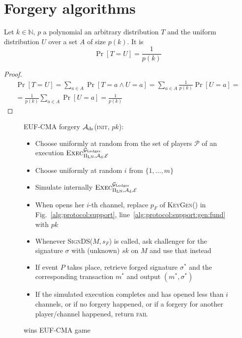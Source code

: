 \section{Forgery algorithms}
  \begin{proposition}
  \label{prop:distrib}
    Let $k \in \mathbb{N}$, $p$ a polynomial an arbitrary distribution $T$ and
    the uniform distribution $U$ over a set $A$ of size $p(k)$. It is
    \begin{equation*}
      \Pr[T = U] = \frac{1}{p(k)}
    \end{equation*}
  \end{proposition}

  \begin{proof}
    \begin{gather*}
      \Pr[T = U] = \sum\limits_{a \in A}\Pr[T = a \wedge U = a] = \sum\limits_{a
      \in A}\frac{1}{p(k)}\Pr[U = a] =\\
      = \frac{1}{p(k)}\sum\limits_{a \in A}\Pr[U = a] = \frac{1}{p(k)}
    \end{gather*}
  \end{proof}

  \begin{figure}[H]
    \begin{algobox}{\textsf{EUF-CMA} forgery}
      $\mathcal{A}_{\mathrm{ds}}$(\textsc{init}, $pk$):
      \begin{itemize}
        \item Choose uniformly at random \alice{} from the set of players
        $\mathcal{P}$ of an execution
        $\textsc{Exec}^{\mathcal{G}_{\mathrm{Ledger}}}_{\Pi_{\mathrm{LN}}, \mathcal{A}_{\mathrm{d}},
        \mathcal{E}}$
        \item Choose uniformly at random $i$ from $\{1, \dots, m\}$
        \item Simulate internally
        $\textsc{Exec}^{\mathcal{G}_{\mathrm{Ledger}}}_{\Pi_{\mathrm{LN}}, \mathcal{A}_{\mathrm{d}},
        \mathcal{E}}$
        \item When \alice{} opens her $i$-th channel, replace $p_F$ of
        \textsc{KeyGen}() in Fig.~\ref{alg:protocol:support},
        line~\ref{alg:protocol:support:gen:fund} with $pk$
        \item Whenever \textsc{SignDS}($M, s_F$) is called, ask challenger for
        the signature $\sigma$ with (unknown) $sk$ on $M$ and use that instead
        \item If event $P$ takes place, retrieve forged signature $\sigma^*$ and
        the corresponding transaction $m^*$ and output $(m^*, \sigma^*)$
        \item If the simulated execution completes and \alice{} has opened less
        than $i$ channels, or if no forgery happened, or if a forgery for
        another player/channel happened, return \textsc{fail}
      \end{itemize}
    \end{algobox}
    \caption{wins \textsf{EUF-CMA} game}
    \label{alg:forge:ds}
  \end{figure}

